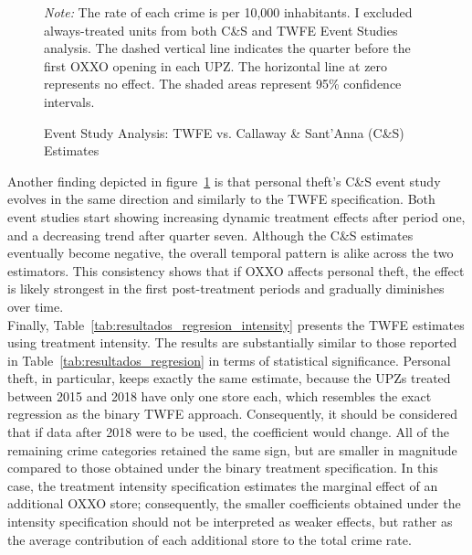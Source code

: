 \documentclass[12pt]{article}
\begin{document}
\begin{figure}[htbp]
    \caption{Event Study Analysis: TWFE vs. Callaway \& Sant’Anna (C\&S) Estimates}
    \label{fig:fourpanelESCompared}
    \vspace{0.1cm}
    \footnotesize{
    \textit{Note:} The rate of each crime is per 10,000 inhabitants. 
    I excluded always-treated units from both C\&S and TWFE Event Studies analysis. 
    The dashed vertical line indicates the quarter before the first OXXO opening in each UPZ. 
    The horizontal line at zero represents no effect. 
    The shaded areas represent 95\% confidence intervals.}
\end{figure}

Another finding depicted in figure~\ref{fig:fourpanelESCompared} is that personal theft’s C\&S event study evolves in the same direction and similarly to the TWFE specification. Both event studies start showing increasing dynamic treatment effects after period one, and a decreasing trend after quarter seven. Although the C\&S estimates eventually become negative, the overall temporal pattern is alike across the two estimators. This consistency shows that if OXXO affects personal theft, the effect is likely strongest in the first post-treatment periods and gradually diminishes over time.\\

Finally, Table~\ref{tab:resultados_regresion_intensity} presents the TWFE estimates using treatment intensity. The results are substantially similar to those reported in Table~\ref{tab:resultados_regresion} in terms of statistical significance. Personal theft, in particular, keeps exactly the same estimate, because the UPZs treated between 2015 and 2018 have only one store each, which resembles the exact regression as the binary TWFE approach. Consequently, it should be considered that if data after 2018 were to be used, the coefficient would change. All of the remaining crime categories retained the same sign, but are smaller in magnitude compared to those obtained under the binary treatment specification. In this case, the treatment intensity specification estimates the marginal effect of an additional OXXO store; consequently, the smaller coefficients obtained under the intensity specification should not be interpreted as weaker effects, but rather as the average contribution of each additional store to the total crime rate.\\ 
\end{document}
